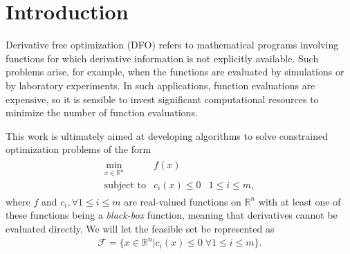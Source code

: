 \documentclass{article}
\theoremstyle{case}
\numberwithin{theorem}{subsection}
\newcommand{\feasible}{{\mathcal F}}
\newcommand{\Rn}{\mathbb R^n}
\begin{document}




% 
% 
% 
% 
% 
% 
% 	
% 
% 	





\section{Introduction}

Derivative free optimization (DFO) refers to mathematical programs involving functions for which derivative information is not explicitly available.
Such problems arise, for example, when the functions are evaluated by simulations or by laboratory experiments.
In such applications, function evaluations are expensive, so it is sensible to invest significant computational resources to minimize the number of function evaluations.

This work is ultimately aimed at developing algorithms to solve constrained optimization problems of the form 
\begin{align*}
\begin{array}{ccl} \min_{x \in \Rn} & f(x) \\
\mbox{subject to} & c_i(x) \le 0 & 1 \le i \le m,
\end{array}
\end{align*}
where 
$f$ and $c_i, \forall 1 \le i \le m$ are real-valued functions on $\Rn$ with at least one of these functions being a {\em black-box} function, meaning that derivatives cannot be evaluated directly.
We will let the feasible set be represented as 
\begin{align}
\feasible = \{x \in \Rn | c_i(x) \le 0 \; \forall 1 \le i \le m \}. \label{define_feasible}
\end{align}
\end{document}
